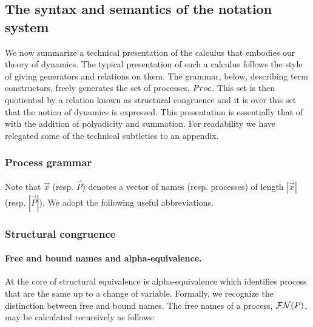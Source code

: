 \subsection{The syntax and semantics of the notation system}\label{sub:the_syntax_and_semantics_of_the_notation_system} %

We now summarize a technical presentation of the calculus that
embodies our theory of dynamics. The typical presentation of such a
calculus follows the style of giving generators and relations on
them. The grammar, below, describing term constructors, freely
generates the set of processes, $\mathbin{Proc}$. This set is then quotiented
by a relation known as structural congruence and it is over this set
that the notion of dynamics is expressed. This presentation is
essentially that of \cite{MeredithR05} with the addition of
polyadicity and summation. For readability we have relegated some of
the technical subtleties to an appendix.

\subsubsection{Process grammar}\label{subsub:process_grammar}


Note that $\vec{x}$ (resp. $\vec{P}$) denotes a vector of names
(resp. processes) of length $|\vec{x}|$ (resp. $|\vec{P}|$). We adopt
the following useful abbreviations.


\subsubsection{Structural congruence}

\paragraph{Free and bound names and alpha-equivalence.} At the
core of structural equivalence is alpha-equivalence which identifies
process that are the same up to a change of variable. Formally, we
recognize the distinction between free and bound names. The free names
of a process, $\mathbin{\mathcal{FN}(P)}$, may be calculated recursively as
follows:

